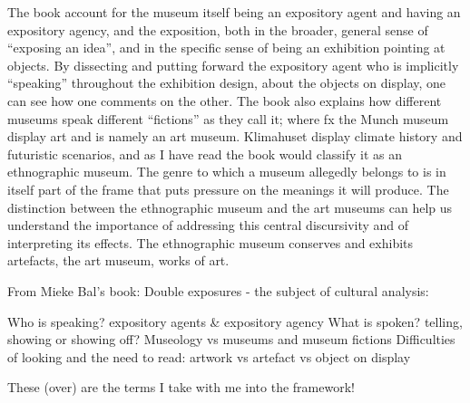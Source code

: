 The book account for the museum itself being an expository agent and having an expository agency, and the exposition, both in the broader, general sense of “exposing an idea”, and in the specific sense of being an exhibition pointing at objects. By dissecting and putting forward the expository agent who is implicitly “speaking” throughout the exhibition design, about the objects on display, one can see how one comments on the other. The book also explains how different museums speak different “fictions” as they call it; where fx the Munch museum display art and is namely an art museum. Klimahuset display climate history and futuristic scenarios, and as I have read the book would classify it as an ethnographic museum. The genre to which a museum allegedly belongs to is in itself part of the frame that puts pressure on the meanings it will produce. The distinction between the ethnographic museum and the art museums can help us understand the importance of addressing this central discursivity and of interpreting its effects. The ethnographic museum conserves and exhibits artefacts, the art museum, works of art.

From Mieke Bal’s book: Double exposures - the subject of cultural analysis:

Who is speaking? expository agents & expository agency
What is spoken? telling, showing or showing off?
Museology vs museums and museum fictions
Difficulties of looking and the need to read: artwork vs artefact vs object on display

These (over) are the terms I take with me into the framework!
